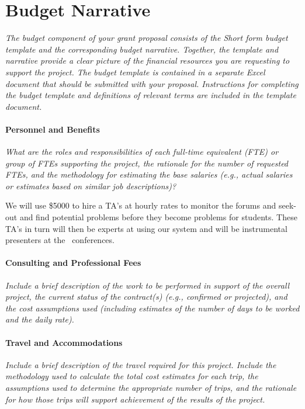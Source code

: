 \section{Budget Narrative}

\textsl{The budget component of your grant proposal consists of the
  Short form budget template and the corresponding budget
  narrative. Together, the template and narrative provide a clear
  picture of the financial resources you are requesting to support the
  project. The budget template is contained in a separate Excel
  document that should be submitted with your proposal. Instructions
  for completing the budget template and definitions of relevant terms
  are included in the template document.}

\paragraph{Personnel and Benefits} 
\textsl{What are the roles and responsibilities of each full-time
  equivalent (FTE) or group of FTEs supporting the project, the
  rationale for the number of requested FTEs, and the methodology for
  estimating the base salaries (e.g., actual salaries or estimates
  based on similar job descriptions)?}

\vspace{\topsep}

We will use \$5000 to hire a TA's at hourly rates to monitor the
forums and seek-out and find potential problems before they become
problems for students. These TA's in turn will then be experts at
using our system and will be instrumental presenters at the
\mooculus\ conferences.


\paragraph{Consulting and Professional Fees}
\textsl{Include a brief description of the work to be performed in
  support of the overall project, the current status of the
  contract(s) (e.g., confirmed or projected), and the cost assumptions
  used (including estimates of the number of days to be worked and the
  daily rate).}


\paragraph{Travel and Accommodations}
\textsl{Include a brief description of the travel required for this
  project.  Include the methodology used to calculate the total cost
  estimates for each trip, the assumptions used to determine the
  appropriate number of trips, and the rationale for how those trips
  will support achievement of the results of the project.}

